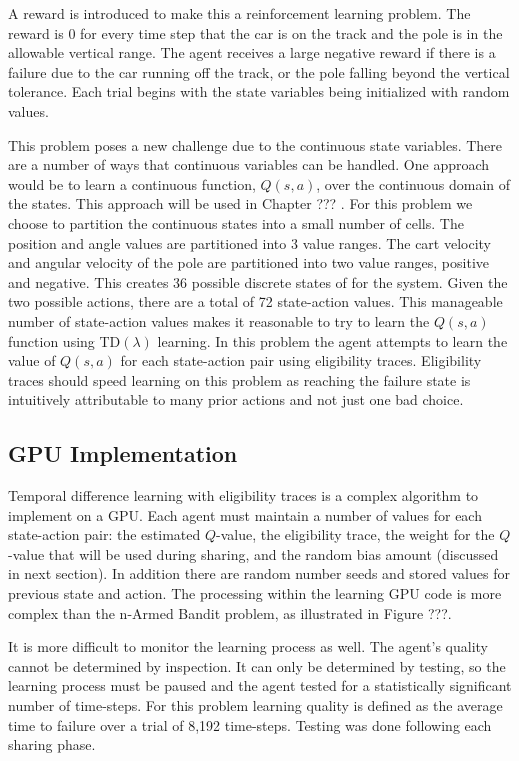 \documentclass[11pt]{article} %
\begin{document}
\begin{flushleft}

A reward is introduced to make this a reinforcement learning problem.  The reward is 0 for every time step that the car is on the track and the pole is in the allowable vertical range.  The agent receives a large negative reward if there is a failure due to the car running off the track, or the pole falling beyond the vertical tolerance.  Each trial begins with the state variables being initialized with random values.

This problem poses a new challenge due to the continuous state variables.  There are a number of ways that continuous variables can be handled.  One approach would be to learn a continuous function, $Q(s,a)$, over the continuous domain of the states.  This approach will be used in Chapter ??? .  For this problem we choose to partition the continuous states into a small number of cells.  The position and angle values are partitioned into 3 value ranges.  The cart velocity and angular velocity of the pole are partitioned into two value ranges, positive and negative.  This creates 36 possible discrete states of for the system.  Given the two possible actions, there are a total of 72 state-action values.  This manageable number of state-action values makes it reasonable to try to learn the $Q(s,a)$ function using TD$(\lambda)$ learning.  In this problem the agent attempts to learn the value of $Q(s,a)$ for each state-action pair using eligibility traces.  Eligibility traces should speed learning on this problem as reaching the failure state is intuitively attributable to many prior actions and not just one bad choice.

\subsection{GPU Implementation}
Temporal difference learning with eligibility traces is a complex algorithm to implement on a GPU.  Each agent must maintain a number of values for each state-action pair: the estimated $Q$-value, the eligibility trace, the weight for the $Q$-value that will be used during sharing, and the random bias amount (discussed in next section).   In addition there are random number seeds and stored values for previous state and action.  The processing within the learning GPU code is more complex than the n-Armed Bandit problem, as illustrated in Figure ???.

It is more difficult to monitor the learning process as well.  The agent’s quality cannot be determined by inspection.  It can only be determined by testing, so the learning process must be paused and the agent tested for a statistically significant number of time-steps.  For this problem learning quality is defined as the average time to failure over a trial of 8,192 time-steps.  Testing was done following each sharing phase. 


\end{flushleft}
\end{document}
